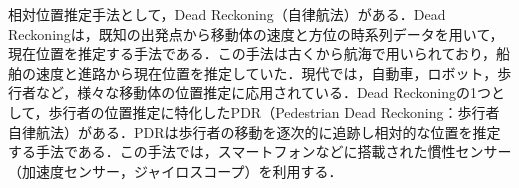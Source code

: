 %
%
%
%
%



相対位置推定手法として，Dead Reckoning（自律航法）がある．Dead Reckoningは，既知の出発点から移動体の速度と方位の時系列データを用いて，現在位置を推定する手法である．この手法は古くから航海で用いられており，船舶の速度と進路から現在位置を推定していた．現代では，自動車，ロボット，歩行者など，様々な移動体の位置推定に応用されている．Dead Reckoningの1つとして，歩行者の位置推定に特化したPDR（Pedestrian Dead Reckoning：歩行者自律航法）がある．PDRは歩行者の移動を逐次的に追跡し相対的な位置を推定する手法である．この手法では，スマートフォンなどに搭載された慣性センサー（加速度センサー，ジャイロスコープ）を利用する．

